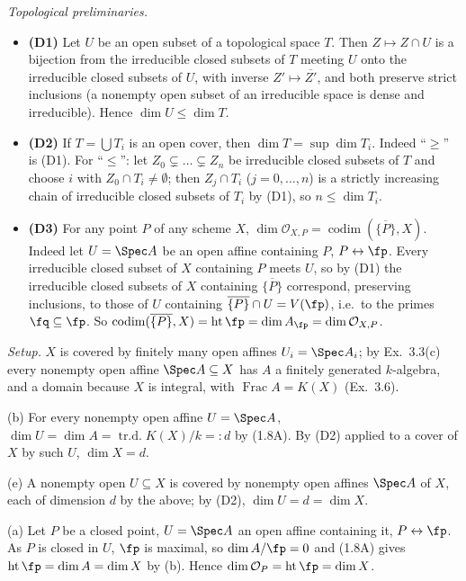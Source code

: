 \documentclass[11pt]{article}
\begin{document}
\emph{Topological preliminaries.}
\begin{itemize}
\item \textbf{(D1)} Let $U$ be an open subset of a topological space $T$. Then $Z\mapsto Z\cap U$ is a bijection from the irreducible closed subsets of $T$ meeting $U$ onto the irreducible closed subsets of $U$, with inverse $Z'\mapsto\overline{Z'}$, and both preserve strict inclusions (a nonempty open subset of an irreducible space is dense and irreducible). Hence $\dim U\le\dim T$.
\item \textbf{(D2)} If $T=\bigcup T_i$ is an open cover, then $\dim T=\sup\dim T_i$. Indeed ``$\ge$'' is (D1). For ``$\le$'': let $Z_0\subsetneq\dots\subsetneq Z_n$ be irreducible closed subsets of $T$ and choose $i$ with $Z_0\cap T_i\ne\emptyset$; then $Z_j\cap T_i$ ($j=0,\dots,n$) is a strictly increasing chain of irreducible closed subsets of $T_i$ by (D1), so $n\le\dim T_i$.
\item \textbf{(D3)} For any point $P$ of any scheme $X$, $\dim\mathcal O_{X,P}=\operatorname{codim}(\overline{\{P\}},X)$. Indeed let $U=\Spec A$ be an open affine containing $P$, $P\leftrightarrow\fp$. Every irreducible closed subset of $X$ containing $P$ meets $U$, so by (D1) the irreducible closed subsets of $X$ containing $\overline{\{P\}}$ correspond, preserving inclusions, to those of $U$ containing $\overline{\{P\}}\cap U=V(\fp)$, i.e.\ to the primes $\fq\subseteq\fp$. So $\operatorname{codim}(\overline{\{P\}},X)=\operatorname{ht}\fp=\dim A_\fp=\dim\mathcal O_{X,P}$.
\end{itemize}

\emph{Setup.} $X$ is covered by finitely many open affines $U_i=\Spec A_i$; by Ex.~3.3(c) every nonempty open affine $\Spec A\subseteq X$ has $A$ a finitely generated $k$-algebra, and a domain because $X$ is integral, with $\operatorname{Frac}A=K(X)$ (Ex.~3.6).

(b) For every nonempty open affine $U=\Spec A$, $\dim U=\dim A=\operatorname{tr.d.}K(X)/k=:d$ by (1.8A). By (D2) applied to a cover of $X$ by such $U$, $\dim X=d$.

(e) A nonempty open $U\subseteq X$ is covered by nonempty open affines $\Spec A$ of $X$, each of dimension $d$ by the above; by (D2), $\dim U=d=\dim X$.

(a) Let $P$ be a closed point, $U=\Spec A$ an open affine containing it, $P\leftrightarrow\fp$. As $P$ is closed in $U$, $\fp$ is maximal, so $\dim A/\fp=0$ and (1.8A) gives $\operatorname{ht}\fp=\dim A=\dim X$ by (b). Hence $\dim\mathcal O_P=\operatorname{ht}\fp=\dim X$.
\end{document}
